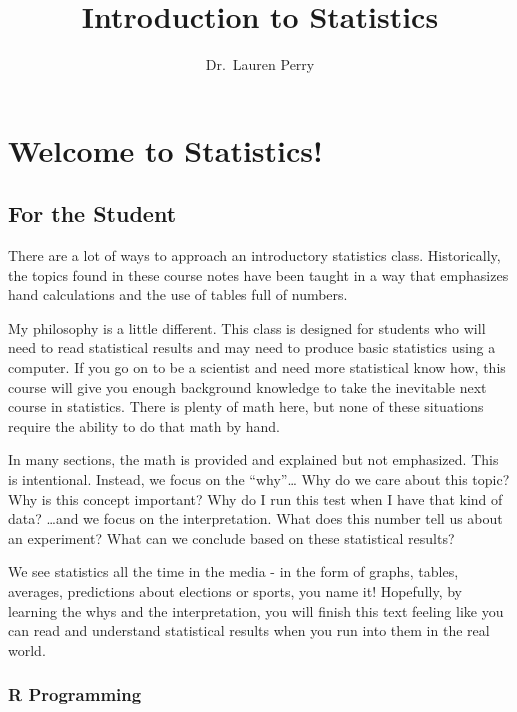 \documentclass[
]{book}
\title{Introduction to Statistics}
\author{Dr.~Lauren Perry}
\date{}
\begin{document}
\maketitle

{
\setcounter{tocdepth}{1}
\tableofcontents
}
\chapter*{Welcome to Statistics!}\label{welcome-to-statistics}

\section*{For the Student}\label{for-the-student}

There are a lot of ways to approach an introductory statistics class. Historically, the topics found in these course notes have been taught in a way that emphasizes hand calculations and the use of tables full of numbers.

My philosophy is a little different. This class is designed for students who will need to read statistical results and may need to produce basic statistics using a computer. If you go on to be a scientist and need more statistical know how, this course will give you enough background knowledge to take the inevitable next course in statistics. There is plenty of math here, but none of these situations require the ability to do that math by hand.

In many sections, the math is provided and explained but not emphasized. This is intentional. Instead, we focus on the ``why''\ldots{} Why do we care about this topic? Why is this concept important? Why do I run this test when I have that kind of data? \ldots and we focus on the interpretation. What does this number tell us about an experiment? What can we conclude based on these statistical results?

We see statistics all the time in the media - in the form of graphs, tables, averages, predictions about elections or sports, you name it! Hopefully, by learning the whys and the interpretation, you will finish this text feeling like you can read and understand statistical results when you run into them in the real world.

\subsection*{R Programming}\label{r-programming}
\end{document}
